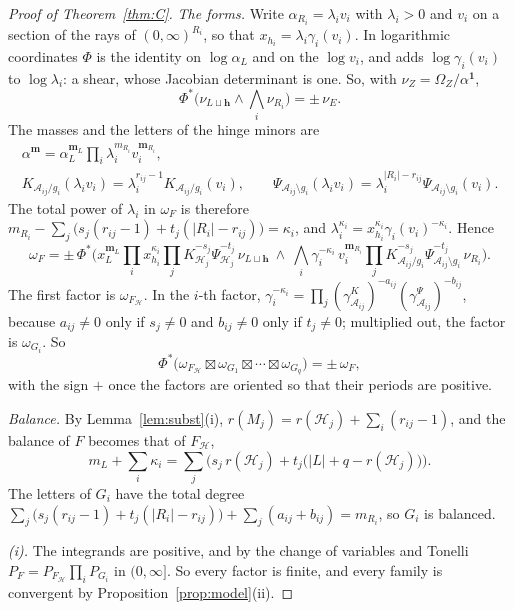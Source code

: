 \documentclass[11pt]{article}
\theoremstyle{plain}
\theoremstyle{definition}
\theoremstyle{remark}
\newcommand{\bm}{\mathbf m}
\begin{document}
\begin{proof}[Proof of Theorem~\ref{thm:C}]
\emph{The forms.} Write $\alpha_{R_i}=\lambda_iv_i$ with $\lambda_i>0$ and $v_i$ on a section of the rays of $(0,\infty)^{R_i}$, so that $x_{h_i}=\lambda_i\gamma_i(v_i)$. In logarithmic coordinates $\Phi$ is the identity on $\log\alpha_L$ and on the $\log v_i$, and adds $\log\gamma_i(v_i)$ to $\log\lambda_i$: a shear, whose Jacobian determinant is one. So, with $\nu_Z=\Omega_Z/\alpha^{\mathbf 1}$,
\[
\Phi^\ast\Big(\nu_{L\sqcup\mathbf h}\wedge\bigwedge_i\nu_{R_i}\Big)=\pm\,\nu_E .
\]
The masses and the letters of the hinge minors are
\begin{gather*}
\alpha^{\bm}=\alpha_L^{\bm_L}\prod_i\lambda_i^{m_{R_i}}v_i^{\bm_{R_i}},\\
K_{\mathcal A_{ij}/g_i}(\lambda_iv_i)=\lambda_i^{r_{ij}-1}K_{\mathcal A_{ij}/g_i}(v_i),\qquad\Psi_{\mathcal A_{ij}\setminus g_i}(\lambda_iv_i)=\lambda_i^{|R_i|-r_{ij}}\Psi_{\mathcal A_{ij}\setminus g_i}(v_i).
\end{gather*}
The total power of $\lambda_i$ in $\omega_F$ is therefore $m_{R_i}-\sum_j\big(s_j(r_{ij}-1)+t_j(|R_i|-r_{ij})\big)=\kappa_i$, and $\lambda_i^{\kappa_i}=x_{h_i}^{\kappa_i}\gamma_i(v_i)^{-\kappa_i}$. Hence
\[
\omega_F=\pm\,\Phi^\ast\Big(x_L^{\bm_L}\prod_ix_{h_i}^{\kappa_i}\prod_jK_{\mathcal H_j}^{-s_j}\Psi_{\mathcal H_j}^{-t_j}\,\nu_{L\sqcup\mathbf h}\ \wedge\ \bigwedge_i\gamma_i^{-\kappa_i}\,v_i^{\bm_{R_i}}\prod_jK_{\mathcal A_{ij}/g_i}^{-s_j}\Psi_{\mathcal A_{ij}\setminus g_i}^{-t_j}\,\nu_{R_i}\Big).
\]
The first factor is $\omega_{F_{\mathcal H}}$. In the $i$-th factor, $\gamma_i^{-\kappa_i}=\prod_j(\gamma^K_{\mathcal A_{ij}})^{-a_{ij}}(\gamma^\Psi_{\mathcal A_{ij}})^{-b_{ij}}$, because $a_{ij}\neq0$ only if $s_j\neq0$ and $b_{ij}\neq0$ only if $t_j\neq0$; multiplied out, the factor is $\omega_{G_i}$. So
\[
\Phi^\ast\big(\omega_{F_{\mathcal H}}\boxtimes\omega_{G_1}\boxtimes\cdots\boxtimes\omega_{G_q}\big)=\pm\,\omega_F,
\]
with the sign $+$ once the factors are oriented so that their periods are positive.

\emph{Balance.} By Lemma~\ref{lem:subst}(i), $r(M_j)=r(\mathcal H_j)+\sum_i(r_{ij}-1)$, and the balance of $F$ becomes that of $F_{\mathcal H}$,
\[
m_L+\sum_i\kappa_i=\sum_j\Big(s_j\,r(\mathcal H_j)+t_j\big(|L|+q-r(\mathcal H_j)\big)\Big).
\]
The letters of $G_i$ have the total degree $\sum_j\big(s_j(r_{ij}-1)+t_j(|R_i|-r_{ij})\big)+\sum_j(a_{ij}+b_{ij})=m_{R_i}$, so $G_i$ is balanced.

\emph{(i).} The integrands are positive, and by the change of variables and Tonelli $P_F=P_{F_{\mathcal H}}\prod_iP_{G_i}$ in $(0,\infty]$. So every factor is finite, and every family is convergent by Proposition~\ref{prop:model}(ii).


\end{proof}
\end{document}
